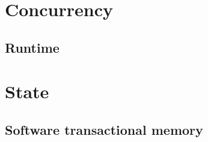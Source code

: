 \section{Concurrency}


\subsection{Runtime}


\section{State}
\subsection{Software transactional memory}
